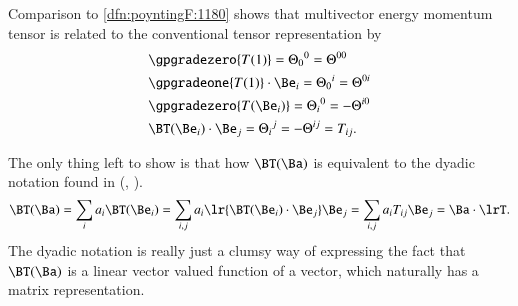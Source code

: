 Comparison to \cref{dfn:poyntingF:1180} shows that multivector energy momentum tensor is related to the conventional tensor representation by
\begin{dmath}\label{eqn:poyntingF:820}
\begin{aligned}
&\gpgradezero{ T(1) }
=
{\Theta_0}^0 = \Theta^{00} \\
&\gpgradeone{ T(1) } \cdot \Be_i
= {\Theta_0}^i = \Theta^{0i} \\
&\gpgradezero{ T(\Be_i) }
= {\Theta_i}^0 = -\Theta^{i0} \\
&\BT(\Be_i) \cdot \Be_j = {\Theta_i}^j = -\Theta^{ij} = T_{ij}.
\end{aligned}
\end{dmath}

The only thing left to show is that how \( \BT(\Ba) \) is equivalent to the dyadic notation found in
(\citep{griffiths1999introduction}, \citep{jackson1975cew}).
\begin{dmath}\label{eqn:poyntingF:1140}
\BT(\Ba)
=
\sum_i a_i \BT(\Be_i)
=
\sum_{i,j} a_i \lr{ \BT(\Be_i) \cdot \Be_j } \Be_j
=
\sum_{i,j} a_i T_{ij} \Be_j
=
\Ba \cdot \lrT.
\end{dmath}
The dyadic notation is really just a clumsy way of expressing the fact that \( \BT(\Ba) \) is a linear vector valued function of a vector, which naturally
has a matrix representation.

